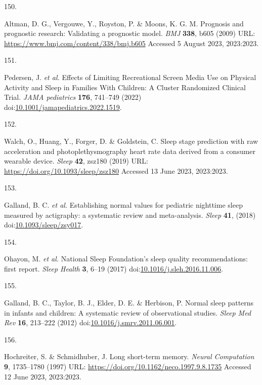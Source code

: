 \documentclass[
  10pt,
]{scrbook}
\newlength{\cslhangindent}
\newlength{\csllabelwidth}
\newlength{\cslentryspacingunit} %
\newenvironment{CSLReferences}[2] %
 {%
  \setlength{\parindent}{0pt}
  \ifodd #1
  \let\oldpar\par
  \def\par{\hangindent=\cslhangindent\oldpar}
  \fi
  \setlength{\parskip}{#2\cslentryspacingunit}
 }%
 {}
\newcommand{\CSLLeftMargin}[1]{\parbox[t]{\csllabelwidth}{#1}}
\newcommand{\CSLRightInline}[1]{\parbox[t]{\linewidth - \csllabelwidth}{#1}\break}
\begin{document}
\begin{CSLReferences}{0}{0}
\leavevmode{}%
\CSLLeftMargin{150. }%
\CSLRightInline{Altman, D. G., Vergouwe, Y., Royston, P. \& Moons, K. G.
M. Prognosis and prognostic research: Validating a prognostic model.
\emph{{BMJ}} \textbf{338}, b605 (2009) URL:
\url{https://www.bmj.com/content/338/bmj.b605} Accessed 5 August 2023,
2023:2023.}

\leavevmode{}%
\CSLLeftMargin{151. }%
\CSLRightInline{Pedersen, J. \emph{et al.} Effects of Limiting
Recreational Screen Media Use on Physical Activity and Sleep in Families
With Children: A Cluster Randomized Clinical Trial. \emph{JAMA
pediatrics} \textbf{176}, 741--749 (2022)
doi:\href{https://doi.org/10.1001/jamapediatrics.2022.1519}{10.1001/jamapediatrics.2022.1519}.}

\leavevmode{}%
\CSLLeftMargin{152. }%
\CSLRightInline{Walch, O., Huang, Y., Forger, D. \& Goldstein, C. Sleep
stage prediction with raw acceleration and photoplethysmography heart
rate data derived from a consumer wearable device. \emph{Sleep}
\textbf{42}, zsz180 (2019) URL:
\url{https://doi.org/10.1093/sleep/zsz180} Accessed 13 June 2023,
2023:2023.}

\leavevmode{}%
\CSLLeftMargin{153. }%
\CSLRightInline{Galland, B. C. \emph{et al.} Establishing normal values
for pediatric nighttime sleep measured by actigraphy: a systematic
review and meta-analysis. \emph{Sleep} \textbf{41}, (2018)
doi:\href{https://doi.org/10.1093/sleep/zsy017}{10.1093/sleep/zsy017}.}

\leavevmode{}%
\CSLLeftMargin{154. }%
\CSLRightInline{Ohayon, M. \emph{et al.} National Sleep Foundation's
sleep quality recommendations: first report. \emph{Sleep Health}
\textbf{3}, 6--19 (2017)
doi:\href{https://doi.org/10.1016/j.sleh.2016.11.006}{10.1016/j.sleh.2016.11.006}.}

\leavevmode{}%
\CSLLeftMargin{155. }%
\CSLRightInline{Galland, B. C., Taylor, B. J., Elder, D. E. \& Herbison,
P. Normal sleep patterns in infants and children: A systematic review of
observational studies. \emph{Sleep Med Rev} \textbf{16}, 213--222 (2012)
doi:\href{https://doi.org/10.1016/j.smrv.2011.06.001}{10.1016/j.smrv.2011.06.001}.}

\leavevmode{}%
\CSLLeftMargin{156. }%
\CSLRightInline{Hochreiter, S. \& Schmidhuber, J. Long short-term
memory. \emph{Neural Computation} \textbf{9}, 1735--1780 (1997) URL:
\url{https://doi.org/10.1162/neco.1997.9.8.1735} Accessed 12 June 2023,
2023:2023.}


\end{CSLReferences}
\end{document}
